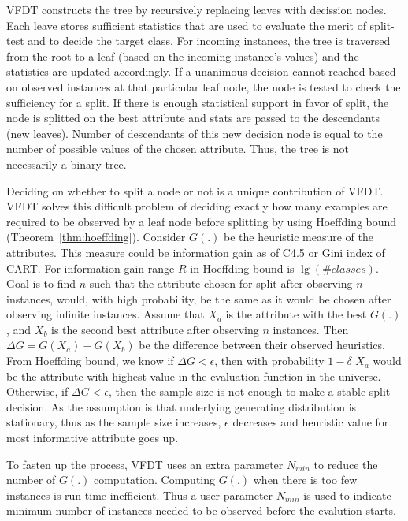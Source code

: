 \documentclass[a4paper, 11pt, oneside]{book}
\begin{document}
VFDT constructs the tree by recursively replacing leaves with decission nodes. Each leave stores sufficient statistics that are used to evaluate the merit of split-test and to decide the target class. For incoming instances, the tree is traversed from the root to a leaf (based on the incoming instance's values) and the statistics are updated accordingly. If a unanimous decision cannot reached based on observed instances at that particular leaf node, the node is tested to check the sufficiency for a split. If there is enough statistical support in favor of split, the node is splitted on the best attribute and stats are passed to the descendants (new leaves). Number of descendants of this new decision node is equal to the number of possible values of the chosen attribute. Thus, the tree is not necessarily a binary tree.

Deciding on whether to split a node or not is a unique contribution of VFDT. VFDT solves this difficult problem of deciding exactly how many examples are required to be observed by a leaf node before splitting by using Hoeffding bound (Theorem~\ref{thm:hoeffding}). Consider $G(.)$ be the heuristic measure of the attributes. This measure could be information gain as of C4.5 or Gini index of CART. For information gain range $R$ in Hoeffding bound is $\lg (\#classes)$. Goal is to find $n$ such that the attribute chosen for split after observing $n$ instances, would, with high probability, be the same as it would be chosen after observing infinite instances. Assume that $X_a$ is the attribute with the best $G(.)$, and $X_b$ is the second best attribute after observing $n$ instances. Then $\Delta G = G(X_a) - G(X_b)$ be the difference between their observed heuristics. From Hoeffding bound, we know if $\Delta G < \epsilon$, then with probability $1 - \delta$ $X_a$ would be the attribute with highest value in the evaluation function in the universe. Otherwise, if $\Delta G < \epsilon$, then the sample size is not enough to make a stable split decision. As the assumption is that underlying generating distribution is stationary, thus as the sample size increases, $\epsilon$ decreases and heuristic value for most informative attribute goes up.

To fasten up the process, VFDT uses an extra parameter $N_{min}$ to reduce the number of $G(.)$ computation. Computing $G(.)$ when there is too few instances is run-time inefficient. Thus a user parameter $N_{min}$ is used to indicate minimum number of instances needed to be observed before the evalution starts.
\end{document}
